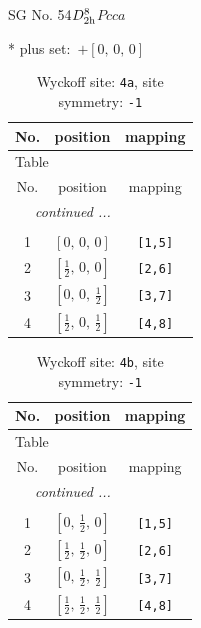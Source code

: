 \documentclass[fleqn,8pt]{jsarticle}
\begin{document}
\setcounter{MaxMatrixCols}{32}

\renewcommand{\tablename}{Table~}
\renewcommand{\figurename}{Figure~}
\begin{center}
\LARGE
SG No. 54\quad$D_{\rm 2h}^{8}$\quad$Pcca$\quad[ orthorhombic ]
\end{center}
* plus set:\,\,\,$+\left[ 0,\, 0,\, 0 \right]$
\renewcommand{\arraystretch}{1.2}
\begin{longtable}{ccc}
\caption{Wyckoff site: {\tt 4a}, site symmetry: {\tt -1}}
 \\
 \hline \hline
No. & position & mapping \\ \hline \endfirsthead

\multicolumn{2}{l}{\tablename\ \thetable{}} \\
 \hline \hline
No. & position & mapping \\ \hline \endhead

 \hline \hline
\multicolumn{2}{r}{\footnotesize\it continued ...} \\ \endfoot

 \hline \hline
\multicolumn{2}{r}{} \\ \endlastfoot

1 & $\left[ 0,\, 0,\, 0 \right]$ & {\tt [1,5]} \\ \hline
2 & $\left[ \frac{1}{2},\, 0,\, 0 \right]$ & {\tt [2,6]} \\ \hline
3 & $\left[ 0,\, 0,\, \frac{1}{2} \right]$ & {\tt [3,7]} \\ \hline
4 & $\left[ \frac{1}{2},\, 0,\, \frac{1}{2} \right]$ & {\tt [4,8]} \\
\end{longtable}
\renewcommand{\arraystretch}{1.2}
\begin{longtable}{ccc}
\caption{Wyckoff site: {\tt 4b}, site symmetry: {\tt -1}}
 \\
 \hline \hline
No. & position & mapping \\ \hline \endfirsthead

\multicolumn{2}{l}{\tablename\ \thetable{}} \\
 \hline \hline
No. & position & mapping \\ \hline \endhead

 \hline \hline
\multicolumn{2}{r}{\footnotesize\it continued ...} \\ \endfoot

 \hline \hline
\multicolumn{2}{r}{} \\ \endlastfoot

1 & $\left[ 0,\, \frac{1}{2},\, 0 \right]$ & {\tt [1,5]} \\ \hline
2 & $\left[ \frac{1}{2},\, \frac{1}{2},\, 0 \right]$ & {\tt [2,6]} \\ \hline
3 & $\left[ 0,\, \frac{1}{2},\, \frac{1}{2} \right]$ & {\tt [3,7]} \\ \hline
4 & $\left[ \frac{1}{2},\, \frac{1}{2},\, \frac{1}{2} \right]$ & {\tt [4,8]} \\
\end{longtable}
\end{document}
